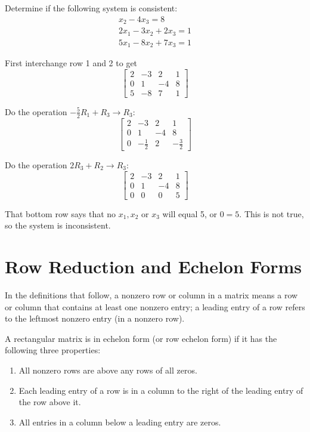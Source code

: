 \documentclass[../linalg.tex]{subfiles}
\begin{document}
\begin{example}
    Determine if the following system is consistent:
    \begin{align*}
        x_2-4x_3=8\\
        2x_1-3x_2+2x_3=1\\
        5x_1-8x_2+7x_3=1
    \end{align*}

    First interchange row 1 and 2 to get \[\begin{bmatrix}
        2 & -3 & 2 & 1\\
        0 & 1 & -4 & 8\\
        5 & -8 & 7 & 1
    \end{bmatrix}\]

    Do the operation $-\frac{5}{2}R_1+R_3\rightarrow R_3$:
    \[\begin{bmatrix}
        2 & -3 & 2 & 1\\
        0 & 1 & -4 & 8\\
        0 & -\frac{1}{2} & 2 & -\frac{3}{2}
    \end{bmatrix}\] 

    Do the operation $2R_3+R_2\rightarrow R_3$:
    \[\begin{bmatrix}
        2 & -3 & 2 & 1\\
        0 & 1 & -4 & 8\\
        0 & 0 & 0 & 5
    \end{bmatrix}\]

    That bottom row says that no $x_1,x_2$ or $x_3$ will equal 5, or $0=5$. This is not true, so the system is inconsistent.
\end{example}

\section{Row Reduction and Echelon Forms}
In the definitions that follow, a nonzero row or column in a matrix means a row or column that contains at least one nonzero entry; a leading entry of a row refers to the leftmost nonzero entry (in a nonzero row).

A rectangular matrix is in echelon form (or row echelon form) if it has the following three properties:
\begin{enumerate}
    \item All nonzero rows are above any rows of all zeros.
    \item Each leading entry of a row is in a column to the right of the leading entry of the row above it.
    \item All entries in a column below a leading entry are zeros.
\end{enumerate}
\end{document}
